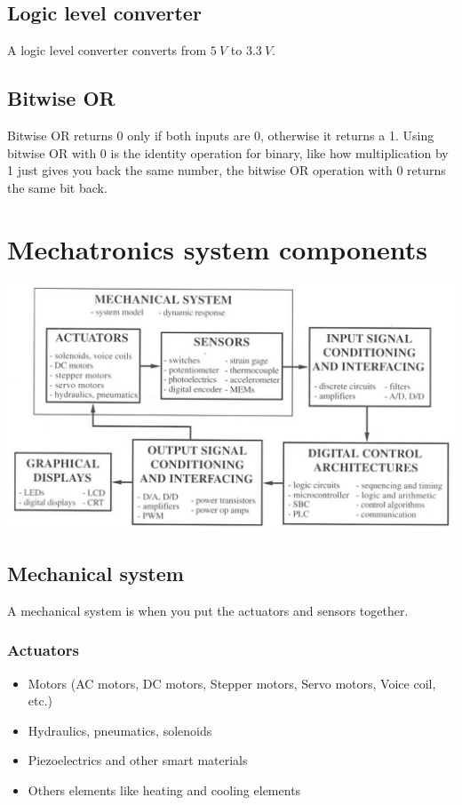 \documentclass[11pt]{article}
\begin{document}
\subsection{Logic level converter}
\label{sec:orgbbf876a}
A logic level converter converts from \(\qty{5}{V}\) to \(\qty{3.3}{V}\).

\subsection{Bitwise OR}
\label{sec:org730e3ba}
Bitwise OR returns 0 only if both inputs are 0, otherwise it returns a 1. Using bitwise OR with 0 is the identity operation for binary, like how multiplication by 1 just gives you back the same number, the bitwise OR operation with 0 returns the same bit back.

 \newpage

\section{Mechatronics system components}
\label{sec:org131c895}
\begin{center}
\includegraphics[width=.9\linewidth]{./images/mechatronics-system-components-overview.png}
\end{center}

\subsection{Mechanical system}
\label{sec:org3ff7464}
A mechanical system is when you put the actuators and sensors together.

\subsubsection{Actuators}
\label{sec:org59cde67}
\begin{itemize}
\item Motors (AC motors, DC motors, Stepper motors, Servo motors, Voice coil, etc.)
\item Hydraulics, pneumatics, solenoids
\item Piezoelectrics and other smart materials
\item Others elements like heating and cooling elements
\end{itemize}
\end{document}

